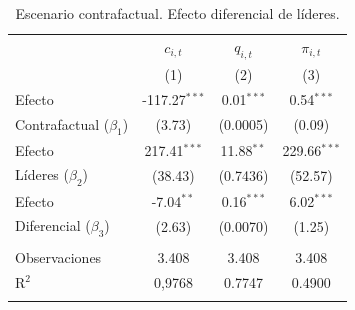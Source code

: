 \begin{table}[H]
   \caption{Escenario contrafactual. Efecto diferencial de líderes.}
   \bigskip
   \centering
   \begin{tabular}{lccc}
      \hline 
      \hline 
      \toprule
                            & $c_{i, t}$ & $q_{i, t}$       & $\pi_{i, t}$ \\   
                            & (1) & (2)           & (3)\\  
      \hline
      \midrule 
      Efecto             & -117.27$^{***}$ & 0.01$^{***}$ & 0.54$^{***}$\\   
      Contrafactual ($\beta_{1}$) & (3.73) & (0.0005)       & (0.09)\\   
      Efecto  & 217.41$^{***}$ & 11.88$^{**}$  & 229.66$^{***}$\\   
      Líderes ($\beta_{2}$) & (38.43) & (0.7436) & (52.57)\\   
      Efecto      & -7.04$^{**}$ & 0.16$^{***}$  & 6.02$^{***}$\\   
      Diferencial ($\beta_{3}$) & (2.63) & (0.0070)        & (1.25)\\
       \\
      \hline
      Observaciones          & 3.408 & 3.408 & 3.408 \\  
      R$^2$                 & 0,9768 & 0.7747 & 0.4900\\  
       \\
   \end{tabular}
\end{table}